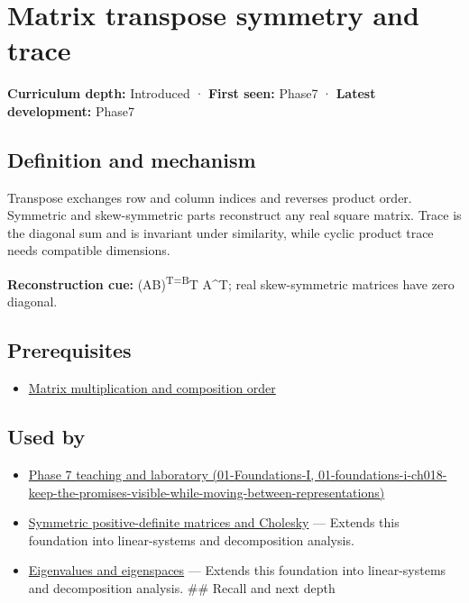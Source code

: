 \hypertarget{appendix-175ca5ff874d}{}
\section{Matrix transpose symmetry and trace}\label{appendix-175ca5ff874d-matrix-transpose-symmetry-and-trace}

\textbf{Curriculum depth:} Introduced · \textbf{First seen:} Phase7 · \textbf{Latest development:} Phase7

\subsection{Definition and mechanism}\label{appendix-175ca5ff874d-definition-and-mechanism}

Transpose exchanges row and column indices and reverses product order. Symmetric and skew-symmetric parts reconstruct any real square matrix. Trace is the diagonal sum and is invariant under similarity, while cyclic product trace needs compatible dimensions.

\textbf{Reconstruction cue:} (AB)\textsuperscript{T=B}T A\^{}T; real skew-symmetric matrices have zero diagonal.

\subsection{Prerequisites}\label{appendix-175ca5ff874d-prerequisites}

\begin{itemize}
\tightlist
\item
  \hyperref[appendix-ab31ef447dbf]{Matrix multiplication and composition order}
\end{itemize}

\subsection{Used by}\label{appendix-175ca5ff874d-used-by}

\begin{itemize}
\tightlist
\item
  \href{../01-Foundations-I/main.pdf\#nameddest=01-foundations-i-ch018-keep-the-promises-visible-while-moving-between-representations}{Phase 7 teaching and laboratory (01-Foundations-I, 01-foundations-i-ch018-keep-the-promises-visible-while-moving-between-representations)}
\item
  \hyperref[appendix-50d2ea3c9b26]{Symmetric positive-definite matrices and Cholesky} --- Extends this foundation into linear-systems and decomposition analysis.
\item
  \hyperref[appendix-0b3be18411f9]{Eigenvalues and eigenspaces} --- Extends this foundation into linear-systems and decomposition analysis. \#\# Recall and next depth
\end{itemize}

